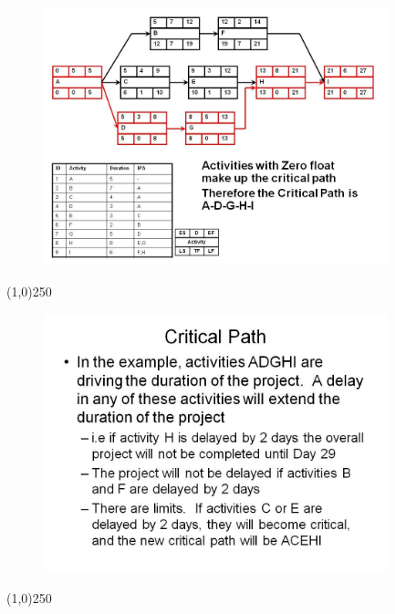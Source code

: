 \begin{frame}
\begin{figure}
	\centering
		\includegraphics[width = 10.0cm]{oldnotes/Slide168.jpg}
\end{figure}
\end{frame}
\begin{center}\line(1,0){250}\end{center}




\begin{frame}
\begin{figure}
	\centering
		\includegraphics[width = 10.0cm]{oldnotes/Slide169.jpg}
\end{figure}
\end{frame}
\begin{center}\line(1,0){250}\end{center}




